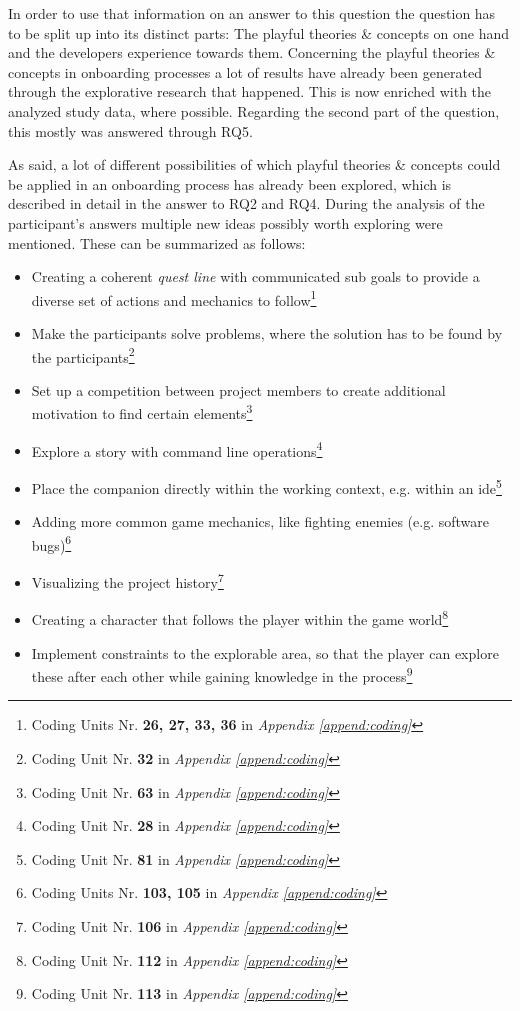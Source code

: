 In order to use that information on an answer to this question the question has to be split up into its distinct parts: The playful theories \& concepts on one hand and the developers experience towards them. Concerning the playful theories \& concepts in onboarding processes a lot of results have already been generated through the explorative research that happened. This is now enriched with the analyzed study data, where possible. Regarding the second part of the question, this mostly was answered through RQ5.

As said, a lot of different possibilities of which playful theories \& concepts could be applied in an onboarding process has already been explored, which is described in detail in the answer to RQ2 and RQ4. During the analysis of the participant's answers multiple new ideas possibly worth exploring were mentioned. These can be summarized as follows:

\begin{itemize}
  \item{Creating a coherent \textit{quest line} with communicated sub goals to provide a diverse set of actions and mechanics to follow\footnote{Coding Units Nr. \textbf{26, 27, 33, 36} in \textit{Appendix \ref{append:coding}}}}
  \item{Make the participants solve problems, where the solution has to be found by the participants\footnote{Coding Unit Nr. \textbf{32} in \textit{Appendix \ref{append:coding}}}}
  \item{Set up a competition between project members to create additional motivation to find certain elements\footnote{Coding Unit Nr. \textbf{63} in \textit{Appendix \ref{append:coding}}}}
  \item{Explore a story with command line operations\footnote{Coding Unit Nr. \textbf{28} in \textit{Appendix \ref{append:coding}}}}
  \item{Place the companion directly within the working context, e.g. within an \gls{ide}\footnote{Coding Unit Nr. \textbf{81} in \textit{Appendix \ref{append:coding}}}}
  \item{Adding more common game mechanics, like fighting enemies (e.g. software bugs)\footnote{Coding Units Nr. \textbf{103, 105} in \textit{Appendix \ref{append:coding}}}}
  \item{Visualizing the project history\footnote{Coding Unit Nr. \textbf{106} in \textit{Appendix \ref{append:coding}}}}
  \item{Creating a character that follows the player within the game world\footnote{Coding Unit Nr. \textbf{112} in \textit{Appendix \ref{append:coding}}}}
  \item{Implement constraints to the explorable area, so that the player can explore these after each other while gaining knowledge in the process\footnote{Coding Unit Nr. \textbf{113} in \textit{Appendix \ref{append:coding}}}}
\end{itemize}

